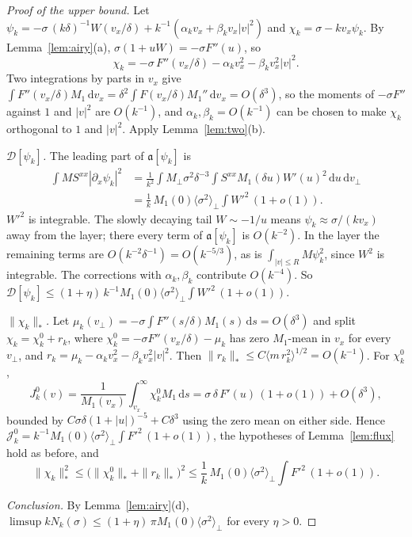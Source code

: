 \documentclass[11pt]{article}
\newcommand{\dd}{\mathrm{d}}
\newcommand{\cD}{\mathcal{D}}
\newcommand{\cJ}{\mathcal{J}}
\newcommand{\fa}{\mathfrak{a}}
\newcommand{\avg}[1]{\langle #1\rangle}
\newcommand{\nstar}[1]{\|#1\|_*}
\theoremstyle{remark}
\begin{document}
\begin{proof}[Proof of the upper bound]
Let
$\psi_k=-\sigma\,(k\delta)^{-1}W(v_x/\delta)+k^{-1}(\alpha_kv_x+\beta_kv_x|v|^2)$
and $\chi_k=\sigma-kv_x\psi_k$. By Lemma~\ref{lem:airy}(a),
$\sigma(1+uW)=-\sigma F''(u)$, so
\[
  \chi_k=-\sigma\,F''(v_x/\delta)-\alpha_kv_x^2-\beta_kv_x^2|v|^2 .
\]
Two integrations by parts in $v_x$ give
$\int F''(v_x/\delta)M_1\,\dd v_x=\delta^2\!\int F(v_x/\delta)M_1''\,\dd v_x
=O(\delta^3)$, so the moments of $-\sigma F''$ against $1$ and $|v|^2$ are
$O(k^{-1})$, and $\alpha_k,\beta_k=O(k^{-1})$ can be chosen to make $\chi_k$
orthogonal to $1$ and $|v|^2$. Apply Lemma~\ref{lem:two}(b).

\emph{$\cD[\psi_k]$.} The leading part of $\fa[\psi_k]$ is
\begin{align*}
  \int MS^{xx}|\partial_x\psi_k|^2
  &=\frac{1}{k^2}\int M_\perp\sigma^2\delta^{-3}\!\int S^{xx}M_1(\delta u)
   W'(u)^2\,\dd u\,\dd v_\perp \\
  &=\frac1k\,M_1(0)\avg{\sigma^2}_\perp\!\int W'^2\,(1+o(1)).
\end{align*}
$W'^2$ is integrable. The slowly decaying tail $W\sim-1/u$ means
$\psi_k\approx\sigma/(kv_x)$ away from the layer; there every term of
$\fa[\psi_k]$ is $O(k^{-2})$. In the layer the remaining terms are
$O(k^{-2}\delta^{-1})=O(k^{-5/3})$, as is $\int_{|v|\le R}M\psi_k^2$, since
$W^2$ is integrable. The corrections with $\alpha_k,\beta_k$ contribute
$O(k^{-4})$. So $\cD[\psi_k]\le(1+\eta)\,k^{-1}M_1(0)\avg{\sigma^2}_\perp
\int W'^2\,(1+o(1))$.

\emph{$\nstar{\chi_k}$.} Let
$\mu_k(v_\perp)=-\sigma\int F''(s/\delta)M_1(s)\,\dd s=O(\delta^3)$ and
split $\chi_k=\chi_k^0+r_k$, where $\chi_k^0=-\sigma F''(v_x/\delta)-\mu_k$
has zero $M_1$-mean in $v_x$ for every $v_\perp$, and
$r_k=\mu_k-\alpha_kv_x^2-\beta_kv_x^2|v|^2$. Then
$\nstar{r_k}\le C\avg{m\,r_k^2}^{1/2}=O(k^{-1})$. For $\chi_k^0$,
\[
  J_k^0(v)=\frac{1}{M_1(v_x)}\int_{v_x}^\infty\chi_k^0M_1\,\dd s
  =\sigma\,\delta\,F'(u)\,(1+o(1))+O(\delta^3),
\]
bounded by $C\sigma\delta(1+|u|)^{-5}+C\delta^3$ using the zero mean on
either side. Hence
$\cJ_k^0=k^{-1}M_1(0)\avg{\sigma^2}_\perp\int F'^2\,(1+o(1))$, the hypotheses
of Lemma~\ref{lem:flux} hold as before, and
\[
  \nstar{\chi_k}^2\le\bigl(\nstar{\chi_k^0}+\nstar{r_k}\bigr)^2
  \le\frac1k\,M_1(0)\avg{\sigma^2}_\perp\!\int F'^2\,(1+o(1)).
\]

\emph{Conclusion.} By Lemma~\ref{lem:airy}(d),
$\limsup kN_k(\sigma)\le(1+\eta)\,\pi M_1(0)\avg{\sigma^2}_\perp$ for every
$\eta>0$.
\end{proof}
\end{document}
